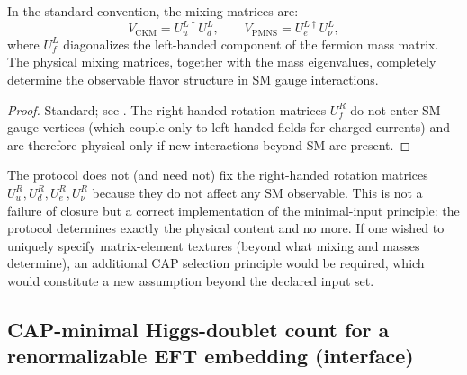 \begin{proposition}\label{prop:mixing_left_rotation}
\InterfaceTag In the standard convention, the mixing matrices are:
\begin{equation}
V_{\mathrm{CKM}} = U_u^{L\dagger} U_d^L, \qquad V_{\mathrm{PMNS}} = U_e^{L\dagger} U_\nu^L,
\end{equation}
where $U_f^L$ diagonalizes the left-handed component of the fermion mass matrix.
The physical mixing matrices, together with the mass eigenvalues, completely determine the observable flavor structure in SM gauge interactions.
\end{proposition}
\begin{proof}
Standard; see \cite{PeskinSchroeder1995,PDGRPP2024}.
The right-handed rotation matrices $U_f^R$ do not enter SM gauge vertices (which couple only to left-handed fields for charged currents) and are therefore physical only if new interactions beyond SM are present.
\end{proof}

\begin{remark}\label{rem:right_rotation_redundancy}
\AuditTag The protocol does not (and need not) fix the right-handed rotation matrices $U_u^R, U_d^R, U_e^R, U_\nu^R$ because they do not affect any SM observable.
This is not a failure of closure but a correct implementation of the minimal-input principle: the protocol determines exactly the physical content and no more.
If one wished to uniquely specify matrix-element textures (beyond what mixing and masses determine), an additional CAP selection principle would be required, which would constitute a new assumption beyond the declared input set.
\end{remark}

\subsection{CAP-minimal Higgs-doublet count for a renormalizable EFT embedding (interface)}
\label{subsec:minimal_higgs_doublet_count}

